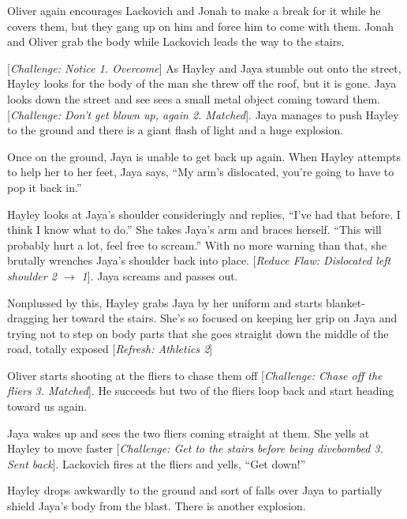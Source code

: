 Oliver again encourages Lackovich and Jonah to make a break for it while he covers them, but they gang up on him and force him to come with them.  Jonah and Oliver grab the body while Lackovich leads the way to the stairs.



{[}\textit{Challenge: Notice 1. Overcome}{]} As Hayley and Jaya stumble out onto the street, Hayley looks for the body of the man she threw off the roof, but it is gone.  Jaya looks down the street and see sees a small metal object coming toward them.  {[}\textit{Challenge: Don't get blown up, again 2. Matched}{]}.  Jaya manages to push Hayley to the ground and there is a giant flash of light and a huge explosion.



Once on the ground, Jaya is unable to get back up again.  When Hayley attempts to help her to her feet, Jaya says, ``My arm's dislocated, you're going to have to pop it back in.''

Hayley looks at Jaya's shoulder consideringly and replies, ``I've had that before.  I think I know what to do.''  She takes Jaya's arm and braces herself.  ``This will probably hurt a lot, feel free to scream.''  With no more warning than that, she brutally wrenches Jaya's shoulder back into place. {[}\textit{Reduce Flaw: Dislocated left shoulder 2 $\rightarrow$ 1}{]}.  Jaya screams and passes out.



Nonplussed by this, Hayley grabs Jaya by her uniform and starts blanket-dragging her toward the stairs.  She's so focused on keeping her grip on Jaya and trying not to step on body parts that she goes straight down the middle of the road, totally exposed {[}\textit{Refresh: Athletics 2}{]}



Oliver starts shooting at the fliers to chase them off {[}\textit{Challenge: Chase off the fliers 3. Matched}{]}.  He succeeds but two of the fliers loop back and start heading toward us again. 



Jaya wakes up and sees the two fliers coming straight at them.  She yells at Hayley to move faster {[}\textit{Challenge: Get to the stairs before being divebombed 3. Sent back}{]}.  Lackovich fires at the fliers and yells, ``Get down!''



Hayley drops awkwardly to the ground and sort of falls over Jaya to partially shield Jaya's body from the blast.  There is another explosion.



